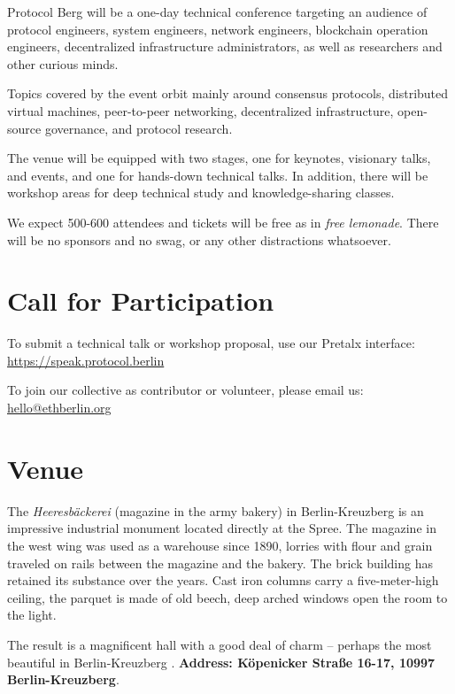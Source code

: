 \documentclass[a4paper,12pt]{article}
\begin{document}
  Protocol Berg will be a one-day technical conference targeting an audience of protocol engineers,
  system engineers, network engineers, blockchain operation engineers, decentralized
  infrastructure administrators, as well as researchers and other curious minds.

  Topics covered by the event orbit mainly around consensus protocols, distributed virtual
  machines, peer-to-peer networking, decentralized infrastructure, open-source governance, and
  protocol research.

  The venue will be equipped with two stages, one for keynotes, visionary talks, and events, and
  one for hands-down technical talks. In addition, there will be workshop areas for deep technical
  study and knowledge-sharing classes.

  We expect 500-600 attendees and tickets will be free as in \textit{free lemonade}. There will
  be no sponsors and no swag, or any other distractions whatsoever.

  \section{Call for Participation}
  To submit a technical talk or workshop proposal, use our Pretalx interface:\\
  \hspace*{3em}\url{https://speak.protocol.berlin}

  To join our collective as contributor or volunteer, please email us:\\
  \hspace*{3em}\url{hello@ethberlin.org}

  \section{Venue}
  The \textit{Heeresbäckerei} (magazine in the army bakery) \cite{backen} in Berlin-Kreuzberg is
  an impressive industrial monument located directly at the Spree. The magazine in the west wing
  was used as a warehouse since 1890, lorries with flour and grain traveled on rails between the
  magazine and the bakery. The brick building has retained its substance over the years. Cast iron
  columns carry a five-meter-high ceiling, the parquet is made of old beech, deep arched windows
  open the room to the light.

  The result is a magnificent hall with a good deal of charm – perhaps the most beautiful in
  Berlin-Kreuzberg \cite{xberg}. \textbf{Address: Köpenicker Straße 16-17, 10997 Berlin-Kreuzberg}.
\end{document}
